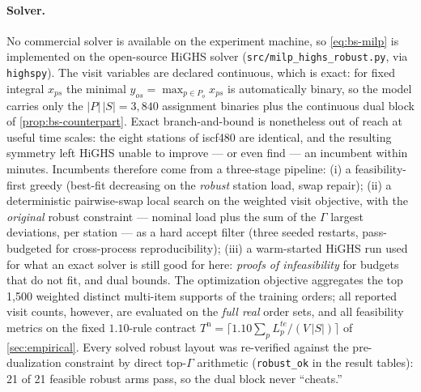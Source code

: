 \paragraph{Solver.}
No commercial solver is available on the experiment machine, so
\cref{eq:bs-milp} is implemented on the open-source HiGHS solver
(\texttt{src/milp\_highs\_robust.py}, via \texttt{highspy}). The visit
variables are declared continuous, which is exact: for fixed integral
$x_{ps}$ the minimal $y_{os} = \max_{p \in P_o} x_{ps}$ is automatically
binary, so the model carries only the $|P|\,|S| = 3{,}840$ assignment binaries
plus the continuous dual block of \cref{prop:bs-counterpart}. Exact
branch-and-bound is nonetheless out of reach at useful time scales: the eight
stations of iscf480 are identical, and the resulting symmetry left HiGHS
unable to improve --- or even find --- an incumbent within minutes. Incumbents
therefore come from a three-stage pipeline: (i) a feasibility-first greedy
(best-fit decreasing on the \emph{robust} station load, swap repair); (ii) a
deterministic pairwise-swap local search on the weighted visit objective, with
the \emph{original} robust constraint --- nominal load plus the sum of the
$\Gamma$ largest deviations, per station --- as a hard accept filter (three
seeded restarts, pass-budgeted for cross-process reproducibility); (iii) a
warm-started HiGHS run used for what an exact solver is still good for here:
\emph{proofs of infeasibility} for budgets that do not fit, and dual bounds.
The optimization objective aggregates the top 1{,}500 weighted distinct
multi-item supports of the training orders; all reported visit counts,
however, are evaluated on the \emph{full real} order sets, and all feasibility
metrics on the fixed $1.10$-rule contract
$T^{\mathrm n} = \lceil 1.10 \sum_p L^{te}_p / (V\,|S|) \rceil$ of
\cref{sec:empirical}. Every solved robust layout was re-verified against the
pre-dualization constraint by direct top-$\Gamma$ arithmetic
(\texttt{robust\_ok} in the result tables): 21 of 21 feasible robust arms
pass, so the dual block never ``cheats.''

